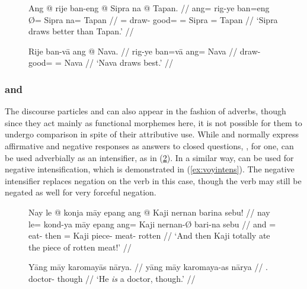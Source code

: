 \begin{figure}[h]
\pex
\a\label{ex:advcomp}\begingl
	\gla Ang @ rije ban-eng {} @ Sipra na @ Tapan. //
	\glb ang= rig-ye ban=eng Ø= Sipra na= Tapan //
	\glc \AgtT{}= draw-\TsgF{} good=\Comp{} \Top{}= Sipra \Gen{}= Tapan //
	\glft `Sipra draws better than Tapan.' //
\endgl

\a\label{ex:advsupl}\begingl
	\gla Rije ban-vā ang @ Nava. //
	\glb rig-ye ban=vā ang= Nava //
	\glc draw-\TsgF{} good=\Supl{} \Aarg{}= Nava //
	\glft `Nava draws best.' //
\endgl
\xe
\end{figure}


\subsubsection{ and }
\label{subsubsec:maayvoy}

The discourse particles  and  can also
appear in the fashion of adverbs, though since they act mainly as functional
morphemes here, it is not possible for them to undergo comparison in spite of
their attributive use. While  and 
normally express affirmative and negative responses as answers to closed
questions, , for one, can be used adverbially as an
intensifier, as in (\ref{ex:maayintens}). In a similar way,  can
be used for negative intensification, which is demonstrated in 
(\ref{ex:voyintens}). The negative intensifier replaces negation on the verb in
this case, though the verb may still be negated as well for very forceful
negation.

\begin{figure}[h]
\pex\label{ex:maayintens}
\a\begingl
	\gla Nay le @ konja māy epang ang @ Kaji nernan barina sebu! //
	\glb nay le= kond-ya māy epang ang= Kaji nernan-Ø bari-na sebu //
	\glc and \PatTI{}= eat-\TsgM{} \Int{} then \Aarg{}= Kaji piece-\Top{} 
		meat-\Gen{} rotten //
	\glft `And then Kaji totally ate the piece of rotten meat!' //
\endgl

\a\begingl
	\gla Yāng māy karomayās nārya. //
	\glb yāng māy karomaya-as nārya //
	\glc \TsgM{}.\Aarg{} \Int{} doctor-\Parg{} though // 
	\glft `He \emph{is} a doctor, though.' //
\endgl
\xe
\end{figure}

